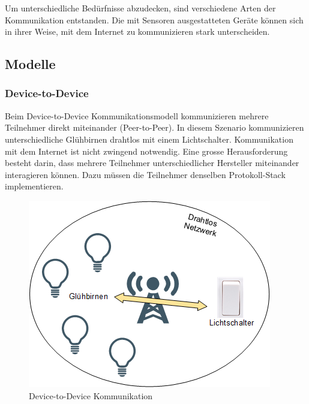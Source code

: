 Um unterschiedliche Bedürfnisse abzudecken, sind verschiedene Arten der Kommunikation entstanden. Die mit Sensoren ausgestatteten Geräte können sich in ihrer Weise, mit dem Internet zu kommunizieren stark unterscheiden.

\subsection{Modelle}
\subsubsection{Device-to-Device}
Beim Device-to-Device Kommunikationsmodell kommunizieren mehrere Teilnehmer direkt miteinander (Peer-to-Peer). In diesem Szenario kommunizieren unterschiedliche Glühbirnen drahtlos mit einem Lichtschalter. Kommunikation mit dem Internet ist nicht zwingend notwendig. Eine grosse Herausforderung besteht darin, dass mehrere Teilnehmer unterschiedlicher Hersteller miteinander interagieren können. Dazu müssen die Teilnehmer denselben Protokoll-Stack implementieren. 
\begin{figure}[H]
\centering
\includegraphics[scale=0.8]{images/device-to-device.png}
\caption{Device-to-Device Kommunikation}
\end{figure}
